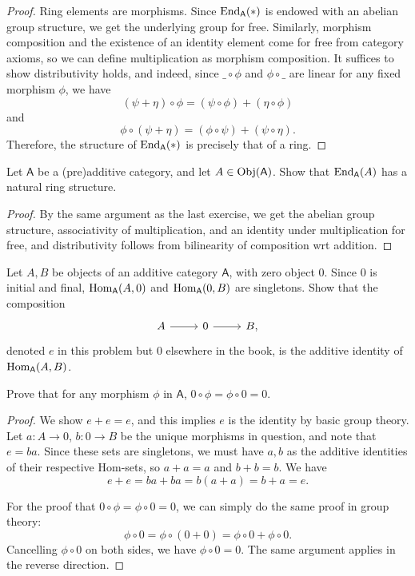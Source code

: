 \documentclass[11pt]{report}
\begin{document}
\begin{proof}
	Ring elements are morphisms. Since $\operatorname{End}_{\mathsf{A} }(*) $ is endowed with an abelian group structure, we get the underlying group for free. Similarly, morphism composition and the existence of an identity element come for free from category axioms, so we can define multiplication as morphism composition. It suffices to show distributivity holds, and indeed, since $\_\circ \phi $ and $\phi \circ \_$ are linear for any fixed morphism $\phi $, we have
	\[
		\left( \psi + \eta  \right) \circ \phi =(\psi \circ \phi )+(\eta \circ \phi )
	\]
	and
	\[
		\phi \circ \left( \psi +\eta  \right) =\left( \phi \circ \psi  \right) +\left( \psi \circ \eta  \right) 
	.\]
	Therefore, the structure of $\operatorname{End}_{\mathsf{A} }(*) $ is precisely that of a ring.
\end{proof}
\begin{exercise}
	Let $\mathsf{A} $ be a (pre)additive category, and let $A\in \operatorname{Obj}(\mathsf{A} ) $. Show that $\operatorname{End}_{\mathsf{A} }(A) $ has a natural ring structure.
\end{exercise}
\begin{proof}
	By the same argument as the last exercise, we get the abelian group structure, associativity of multiplication, and an identity under multiplication for free, and distributivity follows from bilinearity of composition wrt addition.
\end{proof}
\begin{exercise}
	Let $A,B$ be objects of an additive category $\mathsf{A} $, with zero object 0. Since 0 is initial and final, $\operatorname{Hom}_{\mathsf{A} }(A, 0) $ and $\operatorname{Hom}_{\mathsf{A} }(0, B) $ are singletons. Show that the composition
	\[\begin{tikzcd}[row sep = 2.5em, column sep = 2.5em]
		A\arrow[r]&0\arrow[r]&B,
	\end{tikzcd}\]
	denoted $e$ in this problem but $0$ elsewhere in the book, is the additive identity of $\operatorname{Hom}_{\mathsf{A} }(A, B) $.

	Prove that for any morphism $\phi $ in $\mathsf{A} $, $0\circ \phi =\phi \circ 0=0$.
\end{exercise}
\begin{proof}
	We show $e+e=e$, and this implies $e $ is the identity by basic group theory. Let $a : A \to 0$, $b : 0 \to B$ be the unique morphisms in question, and note that $e=ba$. Since these sets are singletons, we must have $a,b$ as the additive identities of their respective Hom-sets, so $a+a=a$ and $b+b=b$. We have
	\[
		e+e=ba+ba=b(a+a)=b+a=e
	.\]
	
	For the proof that $0\circ \phi =\phi \circ 0=0$, we can simply do the same proof in group theory:
	\[
		\phi \circ 0=\phi \circ (0+0)=\phi \circ 0+\phi \circ 0
	.\]
	Cancelling $\phi \circ 0$ on both sides, we have $\phi \circ 0=0$. The same argument applies in the reverse direction.
\end{proof}
\end{document}
